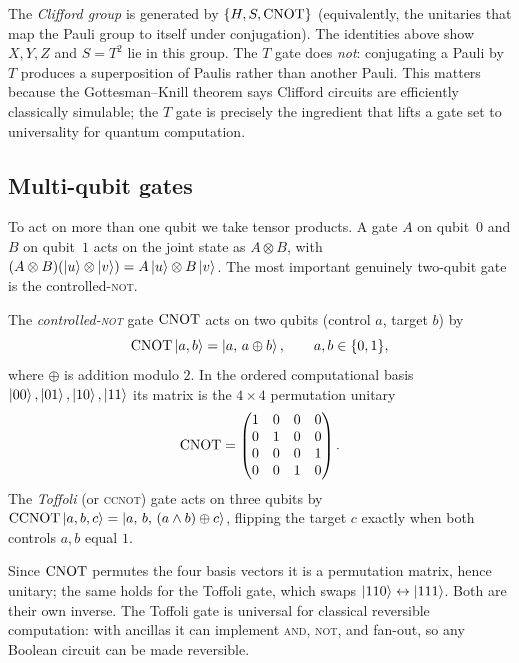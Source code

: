 \begin{remark}
The \emph{Clifford group} is generated by $\{H,S,\mathrm{CNOT}\}$ (equivalently, the
unitaries that map the Pauli group to itself under conjugation). The identities above
show $X,Y,Z$ and $S=T^{2}$ lie in this group. The $T$ gate does \emph{not}:
conjugating a Pauli by $T$ produces a superposition of Paulis rather than another
Pauli. This matters because the Gottesman--Knill theorem says Clifford circuits are
efficiently classically simulable; the $T$ gate is precisely the ingredient that
lifts a gate set to universality for quantum computation.
\end{remark}

\subsection{Multi-qubit gates}

To act on more than one qubit we take tensor products. A gate $A$ on qubit~$0$ and
$B$ on qubit~$1$ acts on the joint state as $A\otimes B$, with
$(A\otimes B)(\ket{u}\otimes\ket{v})=A\ket{u}\otimes B\ket{v}$. The most important
genuinely two-qubit gate is the controlled-\textsc{not}.

\begin{definition}\label{def:lec01-cnot}
The \emph{controlled-\textsc{not}} gate $\mathrm{CNOT}$ acts on two qubits (control $a$,
target $b$) by
\[
  \mathrm{CNOT}\ket{a,b}=\ket{a,\,a\oplus b},\qquad a,b\in\{0,1\},
\]
where $\oplus$ is addition modulo $2$. In the ordered computational basis
$\ket{00},\ket{01},\ket{10},\ket{11}$ its matrix is the $4\times4$ permutation
unitary
\[
  \mathrm{CNOT}=\begin{pmatrix}
    1&0&0&0\\ 0&1&0&0\\ 0&0&0&1\\ 0&0&1&0
  \end{pmatrix}.
\]
The \emph{Toffoli} (or \textsc{ccnot}) gate acts on three qubits by
$\mathrm{CCNOT}\ket{a,b,c}=\ket{a,\,b,\,(a\wedge b)\oplus c}$, flipping the target
$c$ exactly when both controls $a,b$ equal $1$.
\end{definition}

Since $\mathrm{CNOT}$ permutes the four basis vectors it is a permutation matrix, hence
unitary; the same holds for the Toffoli gate, which swaps
$\ket{110}\leftrightarrow\ket{111}$. Both are their own inverse. The Toffoli gate is
universal for classical reversible computation: with ancillas it can implement
\textsc{and}, \textsc{not}, and fan-out, so any Boolean circuit can be made
reversible.

